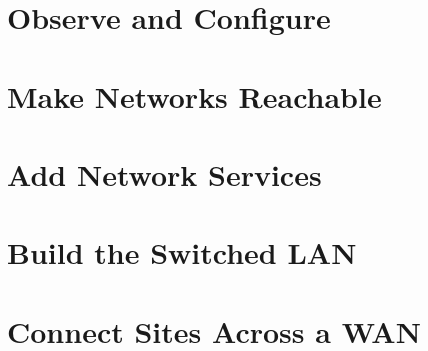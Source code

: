 \documentclass[11pt,oneside,a4paper]{report}
\begin{document}
\utpfrontmatter



\part{Observe and Configure}








\part{Make Networks Reachable}






\part{Add Network Services}






\part{Build the Switched LAN}






\part{Connect Sites Across a WAN}





\end{document}
